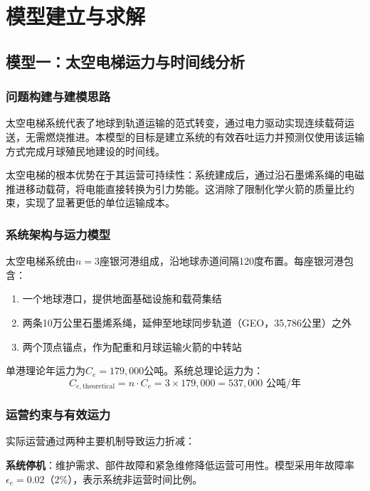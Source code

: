 \newpage
\section{模型建立与求解}

\subsection{模型一：太空电梯运力与时间线分析}

\subsubsection{问题构建与建模思路}

太空电梯系统代表了地球到轨道运输的范式转变，通过电力驱动实现连续载荷运送，无需燃烧推进。本模型的目标是建立系统的有效吞吐运力并预测仅使用该运输方式完成月球殖民地建设的时间线。

太空电梯的根本优势在于其运营可持续性：系统建成后，通过沿石墨烯系绳的电磁推进移动载荷，将电能直接转换为引力势能。这消除了限制化学火箭的质量比约束，实现了显著更低的单位运输成本。

\subsubsection{系统架构与运力模型}

太空电梯系统由$n = 3$座银河港组成，沿地球赤道间隔120度布置。每座银河港包含：
\begin{enumerate}
    \item 一个地球港口，提供地面基础设施和载荷集结
    \item 两条10万公里石墨烯系绳，延伸至地球同步轨道（GEO，35,786公里）之外
    \item 两个顶点锚点，作为配重和月球运输火箭的中转站
\end{enumerate}

单港理论年运力为$C_e = 179,000$公吨。系统总理论运力为：
\begin{equation}
    C_{e,\text{theoretical}} = n \cdot C_e = 3 \times 179,000 = 537,000 \text{ 公吨/年}
    \label{eq:elevator_theoretical}
\end{equation}

\subsubsection{运营约束与有效运力}

实际运营通过两种主要机制导致运力折减：

\textbf{系统停机}：维护需求、部件故障和紧急维修降低运营可用性。模型采用年故障率$\epsilon_e = 0.02$（2\%），表示系统非运营时间比例。

